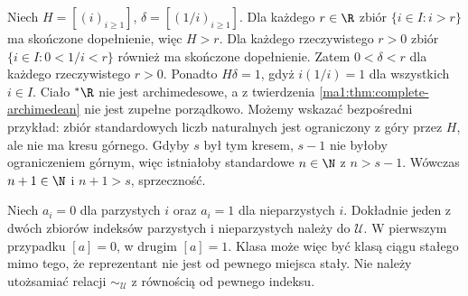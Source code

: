 \begin{przyklad}
\label{ma1:ex:hyperreal-infinitesimal}
Niech $H=[(i)_{i\ge1}]$, $\delta=[(1/i)_{i\ge1}]$. Dla każdego $r\in\R$ zbiór $\{i\in I:i>r\}$ ma skończone dopełnienie, więc $H>r$. Dla każdego rzeczywistego $r>0$ zbiór $\{i\in I:0<1/i<r\}$ również ma skończone dopełnienie. Zatem $0<\delta<r$ dla każdego rzeczywistego $r>0$. Ponadto $H\delta=1$, gdyż $i(1/i)=1$ dla wszystkich $i\in I$. Ciało $\mathord{}^*\R$ nie jest archimedesowe, a z twierdzenia \ref{ma1:thm:complete-archimedean} nie jest zupełne porządkowo. Możemy wskazać bezpośredni przykład: zbiór standardowych liczb naturalnych jest ograniczony z góry przez $H$, ale nie ma kresu górnego. Gdyby $s$ był tym kresem, $s-1$ nie byłoby ograniczeniem górnym, więc istniałoby standardowe $n\in\N$ z $n>s-1$. Wówczas $n+1\in\N$ i $n+1>s$, sprzeczność.
\end{przyklad}

\begin{przyklad}
Niech $a_i=0$ dla parzystych $i$ oraz $a_i=1$ dla nieparzystych $i$. Dokładnie jeden z dwóch zbiorów indeksów parzystych i nieparzystych należy do $\mathcal U$. W pierwszym przypadku $[a]=0$, w drugim $[a]=1$. Klasa może więc być klasą ciągu stałego mimo tego, że reprezentant nie jest od pewnego miejsca stały. Nie należy utożsamiać relacji $\sim_{\mathcal U}$ z równością od pewnego indeksu.
\end{przyklad}

